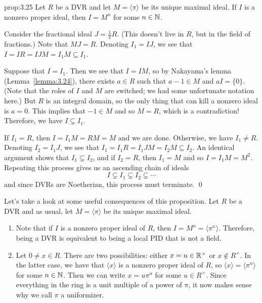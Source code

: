 \begin{prop}{prop:3.25}
    Let $R$ be a DVR and let $M = \langle \pi \rangle$ be its unique maximal ideal. 
    If $I$ is a nonzero proper ideal, then $I = M^n$ for some $n \in \mathbb{N}$. 
\end{prop}\vspace{-0.25cm}
\begin{pf}
    Consider the fractional ideal $J = \frac{1}{\pi}R$. (This 
    doesn't live in $R$, but in the field of fractions.) Note that $MJ = R$. 
    Denoting $I_1 = IJ$, we see that $I = IR = IJM = I_1M \subseteq I_1$.
    
    Suppose that $I = I_1$. Then we see that $I = IM$, so by Nakayama's lemma 
    (Lemma~\ref{lemma:3.24}), there exists $a \in R$ such that $a - 1 \in M$ 
    and $aI = \{0\}$. (Note that the roles of $I$ and $M$ are switched; 
    we had some unfortunate notation here.) But $R$ is an integral domain, 
    so the only thing that can kill a nonzero ideal is $a = 0$. This 
    implies that $-1 \in M$ and so $M = R$, which is a contradiction! 
    Therefore, we have $I \subsetneq I_1$. 

    If $I_1 = R$, then $I = I_1 M = RM = M$ and we are done. Otherwise, 
    we have $I_1 \neq R$. Denoting $I_2 = I_1 J$, we see that 
    $I_1 = I_1 R = I_1 J M = I_2 M \subseteq I_2$. An identical argument 
    shows that $I_1 \subsetneq I_2$, and if $I_2 = R$, then 
    $I_1 = M$ and so $I = I_1 M = M^2$. 
    Repeating this process gives us an ascending chain of ideals 
    \[ I \subsetneq I_1 \subsetneq I_2 \subsetneq \cdots \] 
    and since DVRs are Noetherian, this process must terminate. \qed
\end{pf}\vspace{-0.25cm}
Let's take a look at some useful consequences of this proposition.
Let $R$ be a DVR and as usual, let $M = \langle \pi \rangle$ be its 
unique maximal ideal.
\begin{enumerate}[(1)]
    \item Note that if $I$ is a nonzero proper ideal of $R$, then 
    $I = M^n = \langle \pi^n \rangle$. Therefore, being a DVR is 
    equivalent to being a local PID that is not a field. 
    \item Let $0 \neq x \in R$. There are two possibilities: 
    either $x = u \in \mathbb{R}^\times$ or $x \notin R^\times$. In the latter case, 
    we have that $\langle x \rangle$ is a nonzero proper ideal of $R$, so 
    $\langle x \rangle = \langle \pi^n \rangle$ for some $n \in \mathbb{N}$. 
    Then we can write $x = u\pi^n$ for some $u \in R^\times$. Since 
    everything in the ring is a unit multiple of a power of $\pi$, it 
    now makes sense why we call $\pi$ a uniformizer. 
\end{enumerate}

